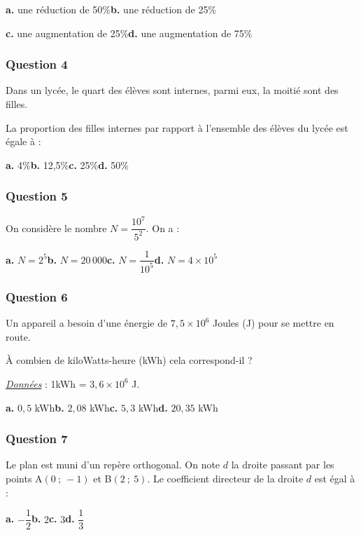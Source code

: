 \textbf{a.} une réduction de 50\%\hfill \textbf{b.} une réduction de 25\%

\textbf{c.} une augmentation de 25\%\hfill \textbf{d.} une augmentation de 75\%

\subsubsection*{Question 4}
Dans un lycée, le quart des élèves sont internes, parmi eux, la moitié sont des filles.

La proportion des filles internes par rapport à l'ensemble des élèves du lycée est égale à :

\textbf{a.} 4\%\hfill \textbf{b.} 12,5\%\hfill \textbf{c.} 25\%\hfill \textbf{d.} 50\%

\subsubsection*{Question 5}
On considère le nombre $N = \dfrac{10^7}{5^2}$. On a :

\textbf{a.} $N = 2^5$\hfill \textbf{b.} $N = 20\,000$\hfill \textbf{c.} $N = \dfrac{1}{10^5}$\hfill \textbf{d.} $N = 4 \times 10^5$

\subsubsection*{Question 6}
Un appareil a besoin d'une énergie de $7,5 \times 10^6$ Joules (J) pour se mettre en route.

À combien de kiloWatts-heure (kWh) cela correspond-il ?

\begin{flushright}
\uline{\textit{Données}} : 1kWh = $3,6 \times 10^6$ J.
\end{flushright}

\textbf{a.} $0,5$ kWh\hfill \textbf{b.} $2,08$ kWh\hfill \textbf{c.} $5,3$ kWh\hfill \textbf{d.} $20,35$ kWh

\subsubsection*{Question 7}
Le plan est muni d'un repère orthogonal. On note $d$ la droite passant par les points A$(0~;~-1)$ et B$(2~;~5)$. Le coefficient directeur de la droite $d$ est égal à :

\textbf{a.} $-\dfrac{1}{2}$\hfill \textbf{b.} $2$\hfill \textbf{c.} $3$\hfill \textbf{d.} $\dfrac{1}{3}$

\bigskip


